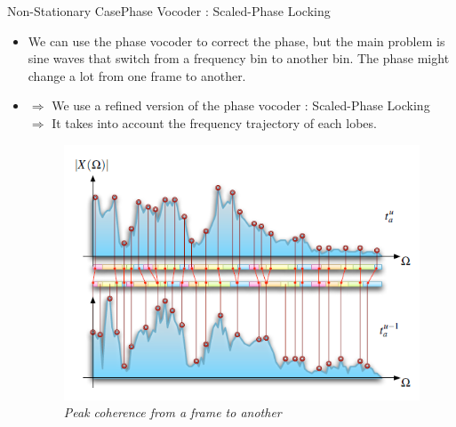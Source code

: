 \documentclass{bredelebeamer}
\begin{document}
\begin{frame}{Non-Stationary Case}{Phase Vocoder : Scaled-Phase Locking}
\begin{itemize}
\item We can use the phase vocoder to correct the phase, but the main problem is sine waves that switch from a frequency bin to another bin. The phase might change a lot from one frame to another.
\item $\Rightarrow$ We use a refined version of the phase vocoder : Scaled-Phase Locking \\
 $\Rightarrow$ It takes into account the frequency trajectory of each lobes.
\begin{figure}
      \includegraphics[scale=0.4]{peaktrajectory.png}
      \caption{\it Peak coherence from a frame to another}
\end{figure}
\end{itemize}

\end{frame}
\end{document}
